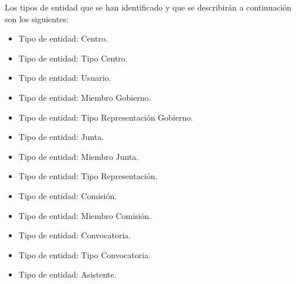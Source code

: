 Los tipos de entidad que se han identificado y que se describirán a continuación son los siguientes:
\begin{itemize}
    \item Tipo de entidad: Centro.
    \item Tipo de entidad: Tipo Centro.
    \item Tipo de entidad: Usuario.
    \item Tipo de entidad: Miembro Gobierno.
    \item Tipo de entidad: Tipo Representación Gobierno.
    \item Tipo de entidad: Junta.
    \item Tipo de entidad: Miembro Junta.
    \item Tipo de entidad: Tipo Representación.
    \item Tipo de entidad: Comisión.
    \item Tipo de entidad: Miembro Comisión.
    \item Tipo de entidad: Convocatoria.
    \item Tipo de entidad: Tipo Convocatoria.
    \item Tipo de entidad: Asistente.
\end{itemize}

